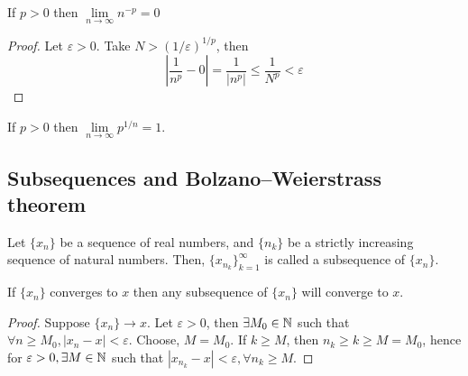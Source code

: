 \begin{theorem}
    If $p>0$ then $\lim \limits_{n \to \infty}n^{-p} = 0$
\end{theorem}

\begin{proof}
    Let $\varepsilon > 0$. Take $N > (1/\varepsilon)^{1/p}$, then
    \begin{equation*}
        \left |
        \frac{1}{n^p} - 0
        \right | = 
        \frac{1}{|n^p|} \leq
        \frac{1}{N^p} <
        \varepsilon
    \end{equation*}
\end{proof}

\begin{theorem}
    If $p>0$ then $\lim \limits_{n \to \infty} p^{1/n}=1$.
\end{theorem}

\subsection{Subsequences and Bolzano–Weierstrass theorem}

\begin{definition}[Subsequence]
    Let $\{x_n\}$ be a sequence of real numbers, and $\{n_k\}$ be a strictly increasing sequence of natural numbers. Then, $\{x_{n_k}\}_{k=1}^\infty$ is called a subsequence of $\{x_n\}$.
\end{definition}

\begin{theorem}
    If $\{x_n\}$ converges to $x$ then any subsequence of $\{x_n\}$ will converge to $x$.
\end{theorem}

\begin{proof}
    Suppose $\{x_n\} \to x$. Let $\varepsilon > 0$, then $\exists M_0 \in \mathbb{N}$ such that $\forall n \geq M_0, |x_n-x| < \varepsilon$. Choose, $M=M_0$. If $k \geq M$, then $n_k \geq k \geq M = M_0$, hence for $\varepsilon>0, \exists M \in \mathbb{N}$ such that $|x_{n_k}-x| < \varepsilon, \forall n_k \geq M$.
\end{proof}

